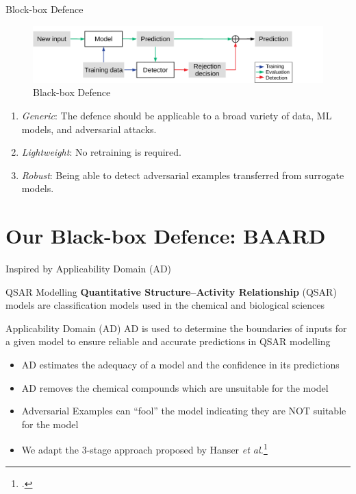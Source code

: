 \documentclass[9pt]{beamer}
\begin{document}
\begin{frame}{Block-box Defence}
\begin{figure}[h!]
    \centering
    \scriptsize
    \includegraphics[width=\linewidth]{images/black-box-defence.pdf}
    \caption{Black-box Defence}
\end{figure}

\begin{enumerate}
    \item {\em Generic}: The defence should be applicable to a broad variety of data, ML models, and adversarial attacks.
    \item {\em Lightweight}: No retraining is required.
    \item {\em Robust}: Being able to detect adversarial examples transferred from surrogate models.
\end{enumerate}
\end{frame}

\section{Our Black-box Defence: BAARD}
\begin{frame}{Inspired by Applicability Domain (AD)}
\begin{block}{QSAR Modelling}
\textbf{Quantitative Structure–Activity Relationship} (QSAR) models are classification models used in the chemical and biological sciences
\end{block}

\begin{block}{Applicability Domain (AD)}
AD is used to determine the boundaries of inputs for a given model to ensure reliable and accurate predictions in QSAR modelling

\begin{itemize}
    \item AD estimates the adequacy of a model and the confidence in its predictions
    \item AD removes the chemical compounds which are unsuitable for the model
\end{itemize}
\end{block}

\begin{itemize}
    \item Adversarial Examples can ``fool'' the model indicating they are NOT suitable for the model
    \item We adapt the 3-stage approach proposed by Hanser {\em et al.}\footcite{hanser2016applicability}
\end{itemize}


\end{frame}
\end{document}
